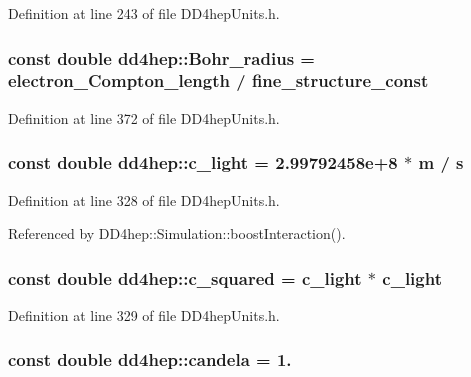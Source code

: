 Definition at line 243 of file DD4hepUnits.h.\hypertarget{namespacedd4hep_a8ac45765a3f92b051e7536784ce5f6d3}{
\subsubsection[{Bohr\_\-radius}]{\setlength{\rightskip}{0pt plus 5cm}const double {\bf dd4hep::Bohr\_\-radius} = {\bf electron\_\-Compton\_\-length} / {\bf fine\_\-structure\_\-const}}}
\label{namespacedd4hep_a8ac45765a3f92b051e7536784ce5f6d3}


Definition at line 372 of file DD4hepUnits.h.\hypertarget{namespacedd4hep_abab5bebb73a5c3123d23fba7c326a0d5}{
\subsubsection[{c\_\-light}]{\setlength{\rightskip}{0pt plus 5cm}const double {\bf dd4hep::c\_\-light} = 2.99792458e+8 $\ast$ m / s}}
\label{namespacedd4hep_abab5bebb73a5c3123d23fba7c326a0d5}


Definition at line 328 of file DD4hepUnits.h.

Referenced by DD4hep::Simulation::boostInteraction().\hypertarget{namespacedd4hep_a1501a5f994e55104b62b1907ff652300}{
\subsubsection[{c\_\-squared}]{\setlength{\rightskip}{0pt plus 5cm}const double {\bf dd4hep::c\_\-squared} = {\bf c\_\-light} $\ast$ {\bf c\_\-light}}}
\label{namespacedd4hep_a1501a5f994e55104b62b1907ff652300}


Definition at line 329 of file DD4hepUnits.h.\hypertarget{namespacedd4hep_ad6c9a17d1f654cad2f47f590edc1bec4}{
\subsubsection[{candela}]{\setlength{\rightskip}{0pt plus 5cm}const double {\bf dd4hep::candela} = 1.}}
\label{namespacedd4hep_ad6c9a17d1f654cad2f47f590edc1bec4}



